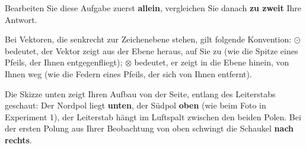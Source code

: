 \documentclass[addpoints,11pt,a4paper]{exam}
\begin{document}
\begin{questions}
\begin{taskbox}
\question[8] Bearbeiten Sie diese Aufgabe zuerst \textbf{allein}, vergleichen
Sie danach \textbf{zu zweit} Ihre Antwort.

Bei Vektoren, die senkrecht zur Zeichenebene stehen, gilt folgende
Konvention: $\odot$ bedeutet, der Vektor zeigt aus der Ebene heraus, auf
Sie zu (wie die Spitze eines Pfeils, der Ihnen entgegenfliegt); $\otimes$
bedeutet, er zeigt in die Ebene hinein, von Ihnen weg (wie die Federn
eines Pfeils, der sich von Ihnen entfernt).

Die Skizze unten zeigt Ihren Aufbau von der Seite, entlang des
Leiterstabs geschaut: Der Nordpol liegt \textbf{unten}, der Südpol
\textbf{oben} (wie beim Foto in Experiment 1), der Leiterstab hängt im
Luftspalt zwischen den beiden Polen. Bei der ersten Polung aus Ihrer
Beobachtung von oben schwingt die Schaukel \textbf{nach rechts}.
\begin{parts}

\end{parts}
\end{taskbox}
\end{questions}
\end{document}
